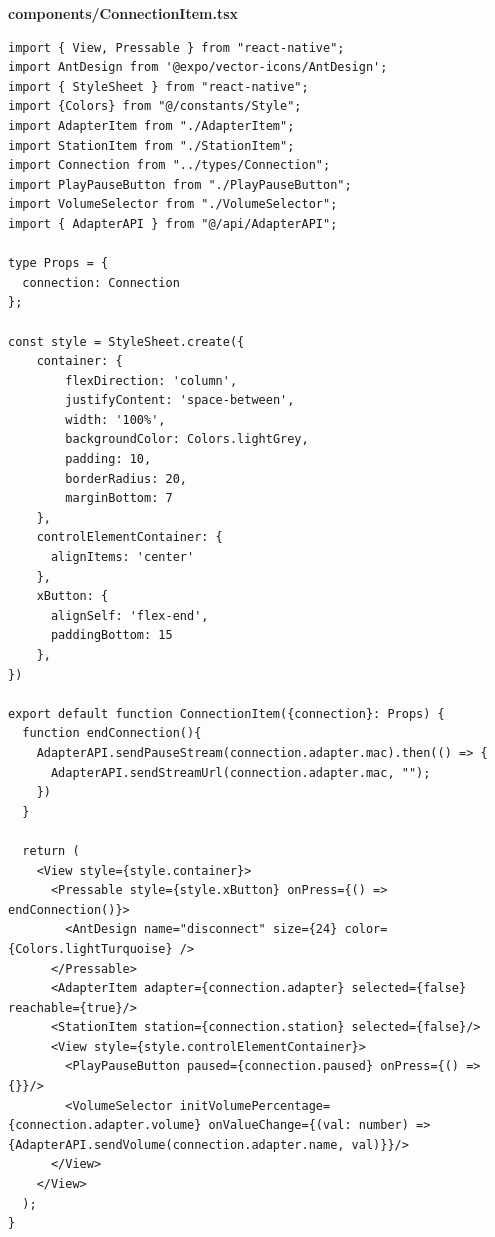 \documentclass[11pt, twoside]{article}
\begin{document}
\textbf{components/ConnectionItem.tsx}
\begin{lstlisting}
import { View, Pressable } from "react-native";
import AntDesign from '@expo/vector-icons/AntDesign';
import { StyleSheet } from "react-native";
import {Colors} from "@/constants/Style";
import AdapterItem from "./AdapterItem";
import StationItem from "./StationItem";
import Connection from "../types/Connection";
import PlayPauseButton from "./PlayPauseButton";
import VolumeSelector from "./VolumeSelector";
import { AdapterAPI } from "@/api/AdapterAPI";

type Props = {
  connection: Connection
};

const style = StyleSheet.create({
    container: {
        flexDirection: 'column',
        justifyContent: 'space-between',
        width: '100%',
        backgroundColor: Colors.lightGrey,
        padding: 10,
        borderRadius: 20,
        marginBottom: 7
    },
    controlElementContainer: {
      alignItems: 'center'
    },
    xButton: {
      alignSelf: 'flex-end',
      paddingBottom: 15
    },
})

export default function ConnectionItem({connection}: Props) {
  function endConnection(){
    AdapterAPI.sendPauseStream(connection.adapter.mac).then(() => {
      AdapterAPI.sendStreamUrl(connection.adapter.mac, "");
    })
  }

  return (
    <View style={style.container}>
      <Pressable style={style.xButton} onPress={() => endConnection()}>
        <AntDesign name="disconnect" size={24} color={Colors.lightTurquoise} />
      </Pressable>
      <AdapterItem adapter={connection.adapter} selected={false} reachable={true}/>
      <StationItem station={connection.station} selected={false}/>
      <View style={style.controlElementContainer}>
        <PlayPauseButton paused={connection.paused} onPress={() => {}}/>
        <VolumeSelector initVolumePercentage={connection.adapter.volume} onValueChange={(val: number) => {AdapterAPI.sendVolume(connection.adapter.name, val)}}/> 
      </View>
    </View>
  );
}
\end{lstlisting}
\end{document}

